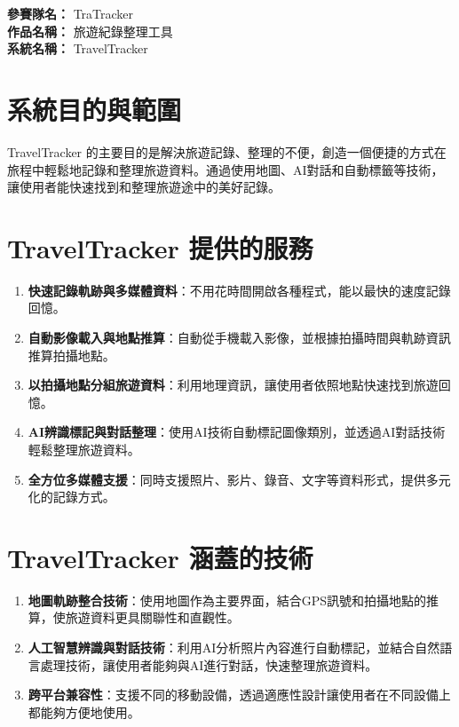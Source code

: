 \noindent
\textbf{參賽隊名：} TraTracker \\
\textbf{作品名稱：} 旅遊紀錄整理工具 \\
\textbf{系統名稱：} TravelTracker

\section{系統目的與範圍}

TravelTracker 的主要目的是解決旅遊記錄、整理的不便，創造一個便捷的方式在旅程中輕鬆地記錄和整理旅遊資料。通過使用地圖、AI對話和自動標籤等技術，讓使用者能快速找到和整理旅遊途中的美好記錄。

\section{TravelTracker 提供的服務}
\begin{enumerate}
  \item \textbf{快速記錄軌跡與多媒體資料}：不用花時間開啟各種程式，能以最快的速度記錄回憶。
  \item \textbf{自動影像載入與地點推算}：自動從手機載入影像，並根據拍攝時間與軌跡資訊推算拍攝地點。
  \item \textbf{以拍攝地點分組旅遊資料}：利用地理資訊，讓使用者依照地點快速找到旅遊回憶。
  \item \textbf{AI辨識標記與對話整理}：使用AI技術自動標記圖像類別，並透過AI對話技術輕鬆整理旅遊資料。
  \item \textbf{全方位多媒體支援}：同時支援照片、影片、錄音、文字等資料形式，提供多元化的記錄方式。
\end{enumerate}

\section{TravelTracker 涵蓋的技術}
\begin{enumerate}
  \item \textbf{地圖軌跡整合技術}：使用地圖作為主要界面，結合GPS訊號和拍攝地點的推算，使旅遊資料更具關聯性和直觀性。
  \item \textbf{人工智慧辨識與對話技術}：利用AI分析照片內容進行自動標記，並結合自然語言處理技術，讓使用者能夠與AI進行對話，快速整理旅遊資料。
  \item \textbf{跨平台兼容性}：支援不同的移動設備，透過適應性設計讓使用者在不同設備上都能夠方便地使用。
\end{enumerate}
